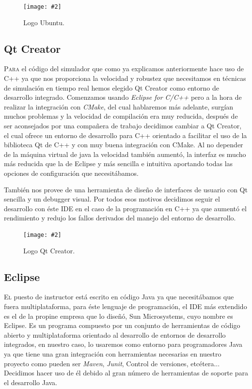 \documentclass[12pt,a4paper,spanish]{book} %
\newcommand{\imgCentradaPeq}[3]{
\begin{figure}[H]
\begin{center}
\texttt{[image: \#2]}
\caption{#3}
\label{#1}
\end{center}
\end{figure}
}
\begin{document}
\imgCentradaPeq{fig.2.9}{img/ubuntu.eps}{Logo Ubuntu.}

\newpage
\subsection{Qt Creator}

\lettrine{P}{ara} el código del simulador que como ya explicamos anteriormente hace uso de C++ ya que nos proporciona la velocidad y robustez que necesitamos en técnicas de simulación en tiempo real hemos elegido Qt Creator como entorno de desarrollo integrado. Comenzamos usando \emph{Eclipse for C/C++} pero a la hora de realizar la integración con \emph{CMake}, del cual hablaremos más adelante, surgían muchos problemas y la velocidad de compilación era muy reducida, después de ser aconsejados por una compañera de trabajo decidimos cambiar a Qt Creator, el cual ofrece un entorno de desarrollo para C++ orientado a facilitar el uso de la biblioteca Qt de C++ y con muy buena integración con CMake. Al no depender de la máquina virtual de java la velocidad también aumentó, la interfaz es mucho más reducida que la de Eclipse y más sencilla e intuitiva aportando todas las opciones de configuración que necesitábamos.

También nos provee de una herramienta de diseño de interfaces de usuario con Qt sencilla y un debugger visual. Por todos esos motivos decidimos seguir el desarrollo con éste IDE en el caso de la programación en C++ ya que aumentó el rendimiento y redujo los fallos derivados del manejo del entorno de desarrollo. 

\imgCentradaPeq{fig.2.10}{img/qtcreator.eps}{Logo Qt Creator.}

\newpage
\subsection{Eclipse}

\lettrine{E}{l} puesto de instructor está escrito en código Java ya que necesitábamos que fuera multiplataforma, para éste lenguaje de programación, el IDE más extendido es el de la propine empresa que lo diseñó, Sun Microsystems, cuyo nombre es Eclipse. Es un programa compuesto por un conjunto de herramientas de código abierto y multiplataforma orientado al desarrollo de entornos de desarrollo integrados, en nuestro caso, lo usaremos como entorno para programadores Java ya que tiene una gran integración con herramientas necesarias en nuestro proyecto como pueden ser \emph{Maven}, \emph{Junit}, Control de versiones, etcétera... Decidimos hacer uso de él debido al gran número de herramientas de soporte para el desarrollo Java.
\end{document}
